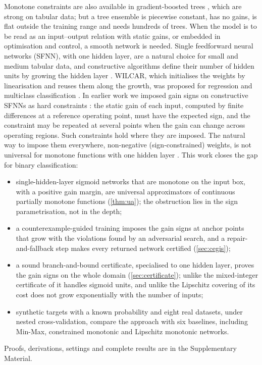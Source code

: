 \documentclass[preprint,12pt,authoryear]{elsarticle}
\begin{document}
Monotone constraints are also available in gradient-boosted trees \citep{ChenGuestrin2016}, which are strong on
tabular data; but a tree ensemble is piecewise constant, has no gains, is flat outside the training range and needs
hundreds of trees. When the model is to be read as an input--output relation with static gains, or embedded in
optimisation and control, a smooth network is needed. Single feedforward neural networks (SFNN), with one hidden layer,
are a natural choice for small and medium tabular data, and constructive algorithms define their number of hidden units by growing the hidden layer
\citep{Fahlman1990,KwokYeung1997,HuangChenSiew2006}. WILCAR, which initialises the weights by linearisation and reuses
them along the growth, was proposed for regression and multiclass classification \citep{Sa2022,Fontes2021}. In earlier
work we imposed gain signs on constructive SFNNs as hard constraints \citep{Sa2026}: the static gain of each input,
computed by finite differences at a reference operating point, must have the expected sign, and the constraint may be
repeated at several points when the gain can change across operating regions. Such constraints hold where they are
imposed. The natural way to impose them everywhere, non-negative (sign-constrained) weights, is not universal for
monotone functions with one hidden layer \citep{DanielsVelikova2010,Gupta2016}. This work closes the gap for binary
classification:
\begin{itemize}
\item single-hidden-layer sigmoid networks that are monotone on the input box, with a positive gain margin, are
universal approximators of continuous partially monotone functions (\cref{thm:ua}); the obstruction lies in the sign
parametrisation, not in the depth;
\item a counterexample-guided training imposes the gain signs at anchor points that grow with the violations found by
an adversarial search, and a repair-and-fallback step makes every returned network certified (\cref{sec:cegis});
\item a sound branch-and-bound certificate, specialised to one hidden layer, proves the gain signs on the whole domain
(\cref{sec:certificate}); unlike the mixed-integer certificate of \citet{Liu2020} it handles sigmoid units, and unlike
the Lipschitz covering of \citet{PoloMolina2026cert} its cost does not grow exponentially with the number of inputs;
\item synthetic targets with a known probability and eight real datasets, under nested cross-validation, compare the
approach with six baselines, including Min-Max, constrained monotonic and Lipschitz monotonic networks.
\end{itemize}
Proofs, derivations, settings and complete results are in the Supplementary Material.
\end{document}
